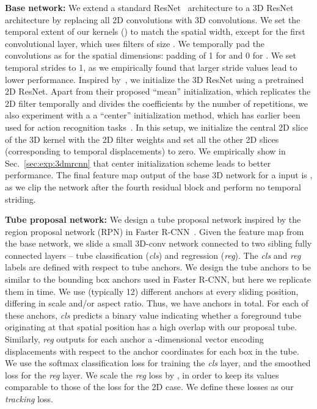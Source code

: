 \documentclass[10pt,twocolumn,letterpaper]{article}
\begin{document}
{\noindent \bf Base network:} We extend a standard ResNet~\cite{He15resnet} architecture to a 3D ResNet architecture
by replacing all 2D convolutions with 3D convolutions. We set the temporal extent of our kernels () to match the
spatial width, except for the first convolutional layer, which uses filters of size . We temporally pad the
convolutions as for the spatial dimensions: padding of 1 for  and 0 for . We set temporal strides
to 1, as we empirically found that larger stride values lead to lower performance. Inspired by~\cite{carreira2017quo,Feichtenhofer16spatiotemporal},
we initialize the 3D ResNet using a pretrained 2D ResNet. Apart from their proposed
``mean'' initialization, which replicates the 2D filter temporally and divides the coefficients by the number of repetitions, we 
also experiment with a
a ``center'' initialization method, which has earlier been used for action recognition tasks~\cite{Feichtenhofer17spatiotemporal}. In this setup, we initialize the central 2D slice of the 3D kernel with the 2D filter weights and set all the other 2D slices (corresponding to temporal displacements) to zero.
We empirically show in Sec.~\ref{sec:exp:3dmrcnn} that center initialization scheme leads to better performance. The final feature map output of the base 3D network for a 
input is , as we clip the network after the fourth residual block and perform no temporal striding.

{\noindent \bf Tube proposal network:}
We design a tube proposal network inspired by the region proposal network (RPN) in Faster R-CNN~\cite{ren2015faster}.
Given the feature map from the base network, we slide a small 3D-conv network connected to two sibling fully
connected layers -- tube classification ({\em cls}) and regression ({\em reg}). The {\em cls} and {\em reg} labels are
defined with respect to tube anchors. We design the tube anchors to be similar to the bounding box anchors used in Faster R-CNN,
but here we replicate them in time. We use  (typically 12) different anchors at every sliding position, differing in scale and/or aspect ratio. Thus, we have  anchors in total. For each of these anchors, {\em cls} predicts a binary value indicating whether a foreground tube originating at that spatial position has a high overlap with our proposal tube. 
Similarly, {\em reg} outputs for each anchor a -dimensional vector encoding  displacements with respect to the anchor coordinates for each box in the tube.
We use the softmax classification loss for training the {\em cls} layer, and the smoothed  loss for the  {\em reg} layer. We scale the {\em reg} loss by , in order to keep its values comparable to those of the loss for the 2D case. We define these losses as our {\em tracking} loss.
\end{document}
